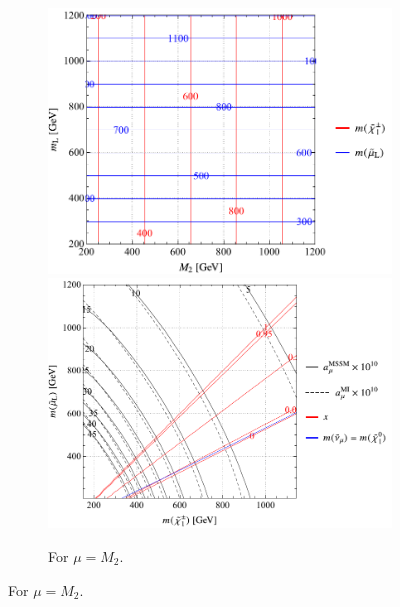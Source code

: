 \documentclass[a4paper,10pt,captions=tableheading,DIV=14]{scrartcl}
\numberwithin{equation}{section}
\begin{document}
\begin{figure}[p]
\begin{subfigure}[b]{\textwidth}
 \includegraphics[scale=0.6]{../plots/plot_spectrum_tab1_massplot.pdf}
\hfill
 \includegraphics[scale=0.6]{../plots/plot_spectrum_tab1_physplot.pdf}
\caption{\label{fig:spectra-tab1} For $\mu=M_2$.}
\end{subfigure}

\vspace{1em}


\end{figure}
\end{document}
